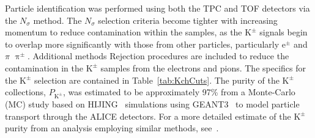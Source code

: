 \documentclass[ALICE,manyauthors]{cernphprep}
\newcommand{\Kpm}{$\mathrm{K^{\pm}}$\xspace}
\begin{document}
Particle identification was performed using both the TPC and TOF detectors via the $N_{\sigma}$ method. 
The $N_{\sigma}$ selection criteria become tighter with increasing momentum to reduce contamination within the samples, as the \Kpm signals begin to overlap more significantly with those from other particles, particularly e$^{\pm}$ and {\color{red}$\pi$} {\color{blue}$\uppi^{\pm}$}.
{\color{red}Additional methods} {\color{blue}Rejection procedures} are included to reduce the contamination in the \Kpm samples from {\color{red}the} electrons and pions.  
The specifics for the \Kpm selection are contained in Table~\ref{tab:KchCuts}.
The purity of the \Kpm collections, $P_{\mathrm{K}^{\pm}}$, was estimated to be approximately 97\% from a Monte-Carlo (MC) study based on HIJING~\cite{PhysRevD.44.3501} simulations using GEANT3~\cite{Brun:1082634} to model particle transport through the ALICE detectors. 
For a more detailed estimate of the \Kpm purity from an analysis employing similar methods, see~\cite{Acharya:2017qtq}.
\end{document}
